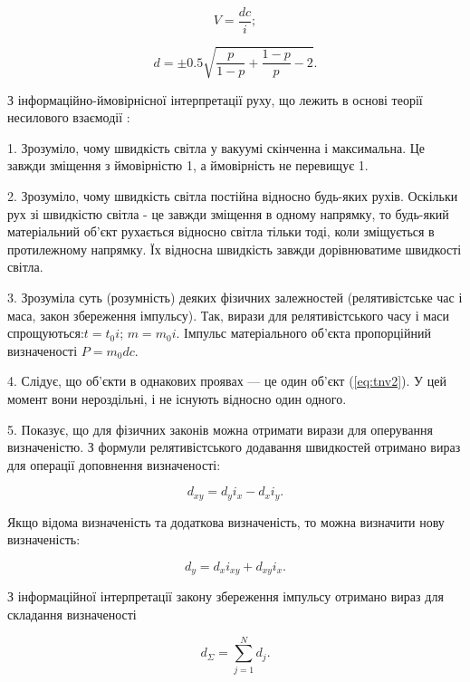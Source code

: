 \begin{equation}
\label{eq:tnv6}
V=\frac{dc}{i};
\end{equation}

\begin{equation}
\label{eq:tnv8}
d=\pm0.5\sqrt{\frac{p}{1-p}+\frac{1-p}{p}-2}.
\end{equation}

З інформаційно-ймовірнісної інтерпретації руху, що лежить в основі теорії несилового взаємодії \cite{Teslia_2010_2}:

1. Зрозуміло, чому швидкість світла у вакуумі скінченна і максимальна. Це завжди зміщення з ймовірністю 1, а ймовірність не перевищує 1.

2. Зрозуміло, чому швидкість світла постійна відносно будь-яких рухів. Оскільки рух зі швидкістю світла - це завжди зміщення в одному напрямку, то будь-який матеріальний об'єкт рухається відносно світла тільки тоді, коли зміщується в протилежному напрямку. Їх відносна швидкість завжди дорівнюватиме швидкості світла.

3. Зрозуміла суть (розумність) деяких фізичних залежностей (релятивістське час і маса, закон збереження імпульсу). Так, вирази для релятивістського часу і маси спрощуються:$t=t_0i$; $m=m_0i$. Імпульс матеріального об'єкта пропорційний визначеності $P=m_0dc$.

4. Слідує, що об'єкти в однакових проявах --- це один об'єкт (\ref{eq:tnv2}). У цей момент вони нероздільні, і не існують відносно один одного.

5. Показує, що для фізичних законів можна отримати вирази для оперування визначеністю. З формули релятивістського додавання швидкостей отримано вираз для операції доповнення визначеності:

\begin{equation}
\label{eq:tnv9}
d_{xy}=d_yi_x-d_xi_y.
\end{equation}

Якщо відома визначеність та додаткова визначеність, то можна визначити нову визначеність:

\begin{equation}
\label{eq:tnv10}
d_y=d_xi_{xy}+d_{xy}i_x.
\end{equation}

З інформаційної інтерпретації закону збереження імпульсу отримано вираз для складання визначеності

\begin{equation}
\label{eq:tnv11}
d_\Sigma = \sum_{j=1}^N d_j.
\end{equation}


